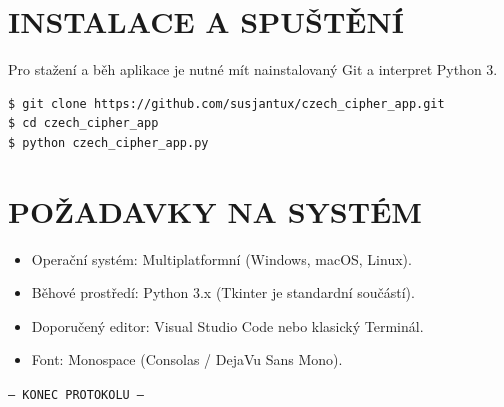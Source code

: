 \documentclass[12pt]{article}
\begin{document}
\section{INSTALACE A SPUŠTĚNÍ}
Pro stažení a běh aplikace je nutné mít nainstalovaný Git a interpret Python 3.
\begin{Verbatim}[frame=single, rulecolor=\color{text_zelena}, fontsize=\large]
$ git clone https://github.com/susjantux/czech_cipher_app.git
$ cd czech_cipher_app
$ python czech_cipher_app.py
\end{Verbatim}

\section{POŽADAVKY NA SYSTÉM}
\begin{itemize}
    \item Operační systém: Multiplatformní (Windows, macOS, Linux).
    \item Běhové prostředí: Python 3.x (Tkinter je standardní součástí).
    \item Doporučený editor: Visual Studio Code nebo klasický Terminál.
    \item Font: Monospace (Consolas / DejaVu Sans Mono).
\end{itemize}

\vspace{2cm}
\begin{center}
    \texttt{\Large --- KONEC PROTOKOLU ---}
\end{center}
\end{document}
